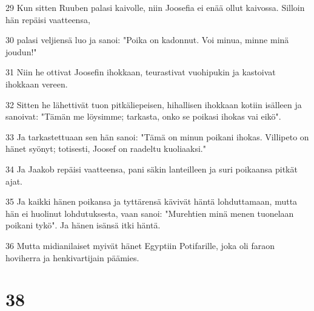\par 29 Kun sitten Ruuben palasi kaivolle, niin Joosefia ei enää ollut kaivossa. Silloin hän repäisi vaatteensa,
\par 30 palasi veljiensä luo ja sanoi: "Poika on kadonnut. Voi minua, minne minä joudun!"
\par 31 Niin he ottivat Joosefin ihokkaan, teurastivat vuohipukin ja kastoivat ihokkaan vereen.
\par 32 Sitten he lähettivät tuon pitkäliepeisen, hihallisen ihokkaan kotiin isälleen ja sanoivat: "Tämän me löysimme; tarkasta, onko se poikasi ihokas vai eikö".
\par 33 Ja tarkastettuaan sen hän sanoi: "Tämä on minun poikani ihokas. Villipeto on hänet syönyt; totisesti, Joosef on raadeltu kuoliaaksi."
\par 34 Ja Jaakob repäisi vaatteensa, pani säkin lanteilleen ja suri poikaansa pitkät ajat.
\par 35 Ja kaikki hänen poikansa ja tyttärensä kävivät häntä lohduttamaan, mutta hän ei huolinut lohdutuksesta, vaan sanoi: "Murehtien minä menen tuonelaan poikani tykö". Ja hänen isänsä itki häntä.
\par 36 Mutta midianilaiset myivät hänet Egyptiin Potifarille, joka oli faraon hoviherra ja henkivartijain päämies.

\chapter{38}

